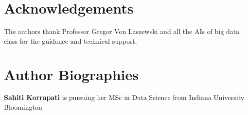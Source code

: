 \documentclass[9pt,twocolumn,twoside]{../../styles/osajnl}
\begin{document}
\section*{Acknowledgements}
The authors thank Professor Gregor Von Laszewski and all the AIs of big data class for the guidance and technical support.


 
\section*{Author Biographies}
\begingroup
\setlength\intextsep{0pt}
\begin{minipage}[t][3.2cm][t]{1.0\columnwidth} %
  \noindent
  {\bfseries Sahiti Korrapati} is pursuing her MSc in Data Science from
  Indiana University Bloomington
\end{minipage}
\endgroup
\end{document}
